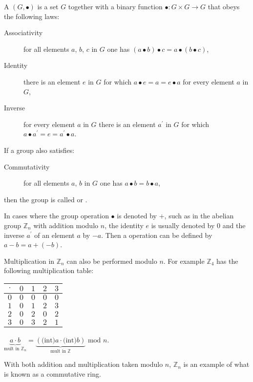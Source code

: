 A  $(G, \bullet)$ is a set $G$ together with a binary function
$\bullet\colon G\times G\rightarrow G$ that obeys the following laws:
\begin{description}
  \item[Associativity] for all elements $a$, $b$, $c$ in $G$ one has
  $(a\bullet b)\bullet c = a\bullet(b\bullet c)$,
  \item[Identity] there is an element $e$ in $G$ for which $a\bullet e=a=e\bullet a$
  for every element $a$ in $G$,
  \item[Inverse] for every element $a$ in $G$ there is an element $a^\prime$ in $G$
  for which $a\bullet a^\prime=e=a^\prime\bullet a$.
\end{description}
If a group also satisfies:
\begin{description}
  \item[Commutativity] for all elements $a$, $b$ in $G$ one has $a\bullet b=b\bullet a$,
\end{description}
then the group is called  or .

In cases where the group operation $\bullet$ is denoted by $+$, such as in
the abelian group $\mathbb{Z}_n$ with addition modulo $n$,
the identity $e$ is usually denoted by $0$
and the inverse $a^\prime$ of an element $a$ by $-a$.
Then a  operation can be defined by $a-b=a+(-b)$.

Multiplication in $\mathbb{Z}_n$ can also be performed modulo $n$.
For example $\mathbb{Z}_4$ has the following multiplication table:

\begin{tabular}{|c|cccc|}\hline
  $\cdot$ & $0$ & $1$ & $2$ & $3$ \\ \hline
  $0$ & $0$ & $0$ & $0$ & $0$ \\
  $1$ & $0$ & $1$ & $2$ & $3$ \\
  $2$ & $0$ & $2$ & $0$ & $2$ \\
  $3$ & $0$ & $3$ & $2$ & $1$ \\ \hline
\end{tabular}
\qquad\qquad
$\underbrace{a\cdot b}_{\mbox{mult in }\mathbb{Z}_n}
= \underbrace{(\mbox{(int)}a\cdot\mbox{(int)}b)}_{\mbox{mult in }\mathbb{Z}} \mbox{ mod } n$.

\noindent With both addition and multiplication taken modulo $n$,
$\mathbb{Z}_n$ is an example of what is known as a commutative ring.

